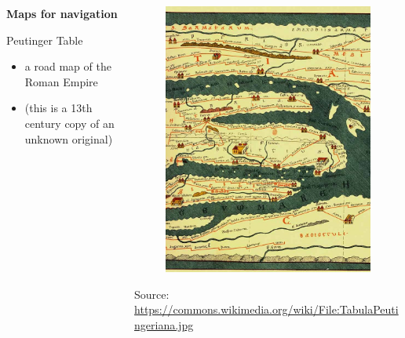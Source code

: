 \documentclass[aspectratio=169]{beamer}
\begin{document}
\begin{frame}
	
	
	
	\begin{columns}
		\begin{column}{0.6\textwidth}
			
			\textbf{Maps for navigation}
			
			\vspace{8mm}
			
			Peutinger Table
			\vspace{3mm}
			\begin{itemize}
				\item a road map of the Roman Empire 
				\item (this is a 13th century copy of an unknown original) 
			\end{itemize} 
		\end{column}
		
		\begin{column}{0.4\textwidth}
			\begin{figure}
				\centering
				\includegraphics[width=1\linewidth]{images/Part_of_Tabula_Peutingeriana.jpg}
			\end{figure}
			\tiny Source: \url{https://commons.wikimedia.org/wiki/File:TabulaPeutingeriana.jpg}
		\end{column}
		
		
	\end{columns}
	
\end{frame}
\end{document}
